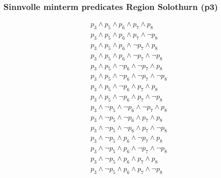 \documentclass[11pt,a4paper,parskip=half]{scrartcl}
\begin{document}
\subsubsection{Sinnvolle minterm predicates Region Solothurn (p3)}
\begin{align*}
p_3 \wedge p_5 \wedge p_6 \wedge p_7 \wedge p_8\\
p_3 \wedge p_5 \wedge p_6 \wedge p_7 \wedge \neg p_8\\
p_3 \wedge p_5 \wedge p_6 \wedge \neg p_7 \wedge p_8\\
p_3 \wedge p_5 \wedge p_6 \wedge \neg p_7 \wedge \neg p_8\\
p_3 \wedge p_5 \wedge \neg p_6 \wedge \neg p_7 \wedge p_8\\
p_3 \wedge p_5 \wedge \neg p_6 \wedge \neg p_7 \wedge \neg p_8\\
p_3 \wedge p_5 \wedge \neg p_6 \wedge  p_7 \wedge p_8\\
p_3 \wedge p_5 \wedge \neg p_6 \wedge  p_7 \wedge \neg p_8\\
p_3 \wedge \neg p_5 \wedge \neg p_6 \wedge \neg p_7 \wedge p_8\\
p_3 \wedge \neg p_5 \wedge \neg p_6 \wedge  p_7 \wedge p_8\\
p_3 \wedge \neg p_5 \wedge \neg p_6 \wedge  p_7 \wedge \neg p_8\\
p_3 \wedge \neg p_5 \wedge  p_6 \wedge \neg p_7 \wedge p_8\\
p_3 \wedge \neg p_5 \wedge  p_6 \wedge \neg p_7 \wedge \neg p_8\\
p_3 \wedge \neg p_5 \wedge  p_6 \wedge  p_7 \wedge  p_8\\
p_3 \wedge \neg p_5 \wedge  p_6 \wedge  p_7 \wedge \neg p_8\\
\end{align*}
\end{document}
